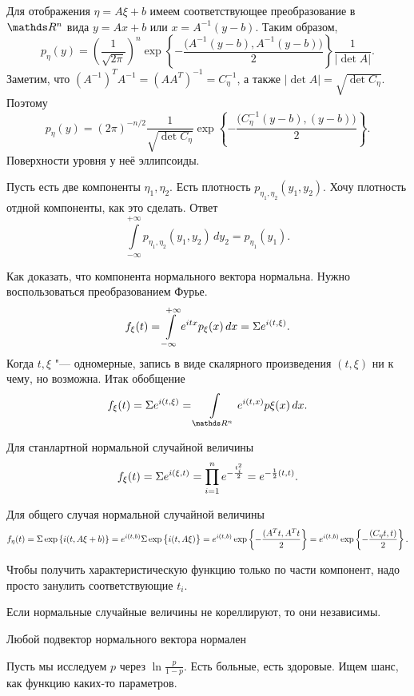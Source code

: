 Для отображения $\eta = A\xi + b$ имеем соответствующее преобразование в $\R^n$ вида $y = Ax +b$ или $x = A^{-1}(y-b)$. Таким образом,
\[
  p_\eta(y) = \left( \frac1{\sqrt{2\pi}} \right)^n\exp\left\{ -\frac{\big(A^{-1}(y-b),A^{-1}(y-b)\big)}{2} \right\}\frac1{|\det A|}.
\]
Заметим, что $(A^{-1})^TA^{-1} = (A A^T)^{-1} = C_\eta^{-1}$, а также $|\det A| = \sqrt{\det C_\eta}$. Поэтому
\[
  p_\eta(y) = (2\pi)^{-n/2}\frac1{\sqrt{\det C_\eta}} \exp\left\{ -\frac{\big(C_\eta^{-1}(y-b),(y-b)\big)}2 \right\}.
\]
Поверхности уровня у неё эллипсоиды.

Пусть есть две компоненты $\eta_1,\eta_2$. Есть плотность $p_{\eta_1,\eta_2}(y_1,y_2)$. Хочу плотность отдной компоненты, как это сделать. Ответ
\[
 \int\limits_{-\infty}^{+\infty} p_{\eta_1,\eta_2}(y_1,y_2)\,dy_2 = p_{\eta_1}(y_1).
\]

Как доказать, что компонента нормального вектора нормальна. Нужно воспользоваться преобразованием Фурье.
\[
  f_\xi(t) = \int\limits_{-\infty}^{+\infty} e^{itx}p_\xi(x)\,dx = \Sigma e^{i(t,\xi)}.
\]
Когда $t,\xi$ "--- одномерные, запись в виде скалярного произведения $(t,\xi)$ ни к чему, но возможна. Итак обобщение
\[
  f_\xi(t) = \E e^{i(t,\xi)} = \int\limits_{\R^n} e^{i(t,x)}p\xi(x)\,dx.
\]

Для станлартной нормальной случайной величины
\[
  f_\xi(t) = \Sigma e^{i(\xi,t)} = \prod\limits_{i=1}^n e^{-\frac{t_i^2}2} = e^{-\frac12(t,t)}.
\]

Для общего случая нормальной случайной величины
\[
  f_\eta(t) = \Sigma\exp\left\{ i(t,A\xi+b) \right\} = e^{i(t,b)} \Sigma\exp\big\{i(t,A\xi)\big\} = 
  e^{i(t,b)}\exp\left\{ -\frac{(A^Tt,A^Tt}2 \right\} = e^{i(t,b)}\exp\left\{ -\frac{(C_\eta t,t)}{2} \right\}.
\]

Чтобы получить характеристическую функцию только по части компонент, надо просто занулить соответствующие $t_i$.

\begin{Ut}
 Если нормальные случайные величины не кореллируют, то они независимы.
\end{Ut}
\begin{Ut}
  Любой подвектор нормального вектора нормален
\end{Ut}

Пусть мы исследуем $p$ через $\ln \frac{p}{1-p}$. Есть больные, есть здоровые. Ищем шанс, как функцию каких-то параметров.
